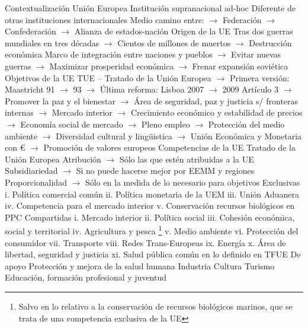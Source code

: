 \documentclass{nuevotema}
\begin{document}
\begin{esquemal}
	\1[] 
		\2 Contextualización
			\3 Unión Europea
				\4 Institución supranacional ad-hoc
				\4[] Diferente de otras instituciones internacionales
				\4[] Medio camino entre:
				\4[] $\to$ Federación
				\4[] $\to$ Confederación
				\4[] $\to$ Alianza de estados-nación
				\4 Origen de la UE
				\4[] Tras dos guerras mundiales en tres décadas
				\4[] $\to$ Cientos de millones de muertos
				\4[] $\to$ Destrucción económica
				\4[] Marco de integración entre naciones y pueblos
				\4[] $\to$ Evitar nuevas guerras
				\4[] $\to$ Maximizar prosperidad económica
				\4[] $\to$ Frenar expansión soviética
				\4 Objetivos de la UE
				\4[] TUE -- Tratado de la Unión Europea
				\4[] $\to$ Primera versión: Maastricht 91 $\to$ 93
				\4[] $\to$ Última reforma: Lisboa 2007 $\to$ 2009
				\4[] Artículo 3
				\4[] $\to$ Promover la paz y el bienestar
				\4[] $\to$ Área de seguridad, paz y justicia s/ fronteras internas
				\4[] $\to$ Mercado interior
				\4[] $\to$ Crecimiento económico y estabilidad de precios
				\4[] $\to$ Economía social de mercado
				\4[] $\to$ Pleno empleo
				\4[] $\to$ Protección del medio ambiente
				\4[] $\to$ Diversidad cultural y lingüistica
				\4[] $\to$ Unión Económica y Monetaria con €
				\4[] $\to$ Promoción de valores europeos
			\3 Competencias de la UE
				\4 Tratado de la Unión Europea
				\4[] Atribución
				\4[] $\to$ Sólo las que estén atribuidas a la UE
				\4[] Subsidiariedad
				\4[] $\to$ Si no puede hacerse mejor por EEMM y regiones
				\4[] Proporcionalidad
				\4[] $\to$ Sólo en la medida de lo necesario para objetivos
				\4 Exclusivas
				\4[] i. Política comercial común
				\4[] ii. Política monetaria de la UEM
				\4[] iii. Unión Aduanera
				\4[] iv. Competencia para el mercado interior
				\4[] v. Conservación recursos biológicos en PPC
				\4 Compartidas
				\4[] i. Mercado interior
				\4[] ii. Política social
				\4[] iii. Cohesión económica, social y territorial
				\4[] iv. Agricultura y pesca \footnote{Salvo en lo relativo a la conservación de recursos biológicos marinos, que se trata de una competencia exclusiva de la UE}
				\4[] v. Medio ambiente
				\4[] vi. Protección del consumidor
				\4[] vii. Transporte
				\4[] viii. Redes Trans-Europeas
				\4[] ix. Energía
				\4[] x. Área de libertad, seguridad y justicia
				\4[] xi. Salud pública común en lo definido en TFUE
				\4 De apoyo
				\4[] Protección y mejora de la salud humana
				\4[] Industria
				\4[] Cultura
				\4[] Turismo
				\4[] Educación, formación profesional y juventud

\end{esquemal}
\end{document}
